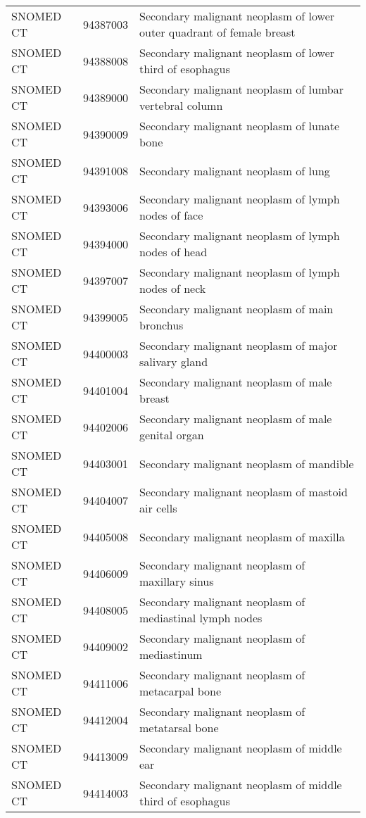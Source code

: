 \begin{longtable}{p{}p{}p{}}
  SNOMED CT & 94387003 & Secondary malignant neoplasm of lower outer quadrant of female breast \\ 
  SNOMED CT & 94388008 & Secondary malignant neoplasm of lower third of esophagus \\ 
  SNOMED CT & 94389000 & Secondary malignant neoplasm of lumbar vertebral column \\ 
  SNOMED CT & 94390009 & Secondary malignant neoplasm of lunate bone \\ 
  SNOMED CT & 94391008 & Secondary malignant neoplasm of lung \\ 
  SNOMED CT & 94393006 & Secondary malignant neoplasm of lymph nodes of face \\ 
  SNOMED CT & 94394000 & Secondary malignant neoplasm of lymph nodes of head \\ 
  SNOMED CT & 94397007 & Secondary malignant neoplasm of lymph nodes of neck \\ 
  SNOMED CT & 94399005 & Secondary malignant neoplasm of main bronchus \\ 
  SNOMED CT & 94400003 & Secondary malignant neoplasm of major salivary gland \\ 
  SNOMED CT & 94401004 & Secondary malignant neoplasm of male breast \\ 
  SNOMED CT & 94402006 & Secondary malignant neoplasm of male genital organ \\ 
  SNOMED CT & 94403001 & Secondary malignant neoplasm of mandible \\ 
  SNOMED CT & 94404007 & Secondary malignant neoplasm of mastoid air cells \\ 
  SNOMED CT & 94405008 & Secondary malignant neoplasm of maxilla \\ 
  SNOMED CT & 94406009 & Secondary malignant neoplasm of maxillary sinus \\ 
  SNOMED CT & 94408005 & Secondary malignant neoplasm of mediastinal lymph nodes \\ 
  SNOMED CT & 94409002 & Secondary malignant neoplasm of mediastinum \\ 
  SNOMED CT & 94411006 & Secondary malignant neoplasm of metacarpal bone \\ 
  SNOMED CT & 94412004 & Secondary malignant neoplasm of metatarsal bone \\ 
  SNOMED CT & 94413009 & Secondary malignant neoplasm of middle ear \\ 
  SNOMED CT & 94414003 & Secondary malignant neoplasm of middle third of esophagus \\ 

\end{longtable}
